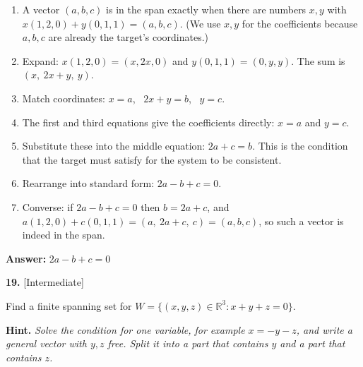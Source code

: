 \documentclass[11pt]{article}
\begin{document}
\begin{tcolorbox}[breakable,colback=ans,colframe=ansb,boxrule=0.5pt,left=4pt,right=4pt,top=2pt,bottom=2pt]\begin{enumerate}[leftmargin=2.2em,itemsep=1pt,topsep=1pt,label=\textbf{Step \arabic*.}]\item A vector $(a,b,c)$ is in the span exactly when there are numbers $x,y$ with $x(1,2,0)+y(0,1,1)=(a,b,c)$. (We use $x,y$ for the coefficients because $a,b,c$ are already the target's coordinates.)
\item Expand: $x(1,2,0)=(x,2x,0)$ and $y(0,1,1)=(0,y,y)$. The sum is $(x,\ 2x+y,\ y)$.
\item Match coordinates: $x=a$, \ $2x+y=b$, \ $y=c$.
\item The first and third equations give the coefficients directly: $x=a$ and $y=c$.
\item Substitute these into the middle equation: $2a+c=b$. This is the condition that the target must satisfy for the system to be consistent.
\item Rearrange into standard form: $2a-b+c=0$.
\item Converse: if $2a-b+c=0$ then $b=2a+c$, and $a(1,2,0)+c(0,1,1)=(a,\ 2a+c,\ c)=(a,b,c)$, so such a vector is indeed in the span.
\end{enumerate}\textbf{Answer:} $2a-b+c=0$\end{tcolorbox}
\par\vspace{2pt}
\begin{minipage}{\linewidth}\textbf{19.} \hfill{\scriptsize\color{ink}[Intermediate]}\par\nopagebreak Find a finite spanning set for $W=\{(x,y,z)\in\mathbb{R}^{3}:x+y+z=0\}$.
\par\smallskip\begingroup\small\color{ink}\textbf{Hint.} \textit{Solve the condition for one variable, for example $x=-y-z$, and write a general vector with $y,z$ free. Split it into a part that contains $y$ and a part that contains $z$.}\endgroup
\end{minipage}\par\nopagebreak
\end{document}
